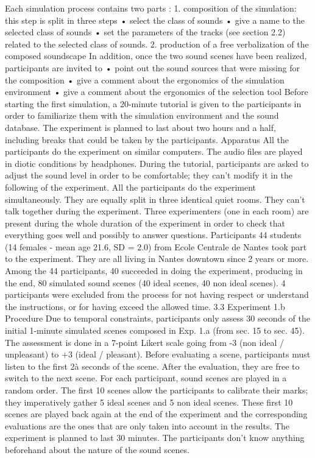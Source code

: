 Each simulation process contains two parts : 1. composition of the simulation: this step is split in three steps • select the class of sounds • give a name to the selected class of sounds • set the parameters of the tracks (see section 2.2) related to the selected class of sounds. 2. production of a free verbalization of the composed soundscape
In addition, once the two sound scenes have been realized, participants are invited to • point out the sound sources that were missing for the composition • give a comment about the ergonomics of the simulation environment • give a comment about the ergonomics of the selection tool
Before starting the first simulation, a 20-minute tutorial is given to the participants in order to familiarize them with the simulation environment and the sound database. The experiment is planned to last about two hours and a half, including breaks that could be taken by the participants.
Apparatus All the participants do the experiment on similar computers. The audio files are played in diotic conditions by headphones. During the tutorial, participants are asked to adjust the sound level in order to be comfortable; they can’t modify it in the following of the experiment. All the participants do the experiment simultaneously. They are equally split in three identical quiet rooms. They can’t talk together during the experiment. Three experimenters (one in each room) are present during the whole duration of the experiment in order to check that everything goes well and possibly to answer questions.
Participants 44 students (14 females - mean age 21.6, SD = 2.0) from Ecole Centrale de Nantes took part to the experiment. They are all living in Nantes downtown since 2 years or more. Among the 44 participants, 40 succeeded in doing the experiment, producing in the end, 80 simulated sound scenes (40 ideal scenes, 40 non ideal scenes). 4 participants were excluded from the process for not having respect or understand the instructions, or for having exceed the allowed time.
3.3 Experiment 1.b
Procedure Due to temporal constraints, participants only assess 30 seconds of the initial 1-minute simulated scenes composed in Exp. 1.a (from sec. 15 to sec. 45). The assessment is done in a 7-point Likert scale going from -3 (non ideal / unpleasant) to +3 (ideal / pleasant). Before evaluating a scene, participants must listen to the first 2à seconds of the scene. After the evaluation, they are free to switch to the next scene. For each participant, sound scenes are played in a random order. The first 10 scenes allow the participants to calibrate their marks; they imperatively gather 5 ideal scenes and 5 non ideal scenes. These first 10 scenes are played back again at the end of the experiment and the corresponding evaluations are the ones that are only taken into account in the results. The experiment is planned to last 30 minutes. The participants don’t know anything beforehand about the nature of the sound scenes.
